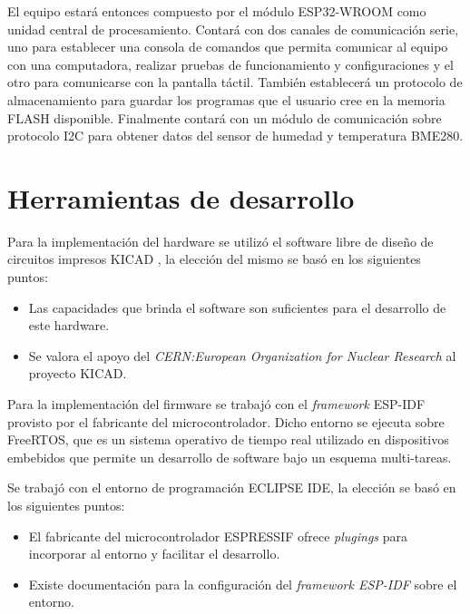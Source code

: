 El equipo estará entonces compuesto por el módulo ESP32-WROOM como unidad central de procesamiento. Contará con dos canales de comunicación serie, uno para establecer una consola de comandos que permita comunicar al equipo con una computadora, realizar pruebas de funcionamiento y configuraciones y el otro para comunicarse con la pantalla táctil. También establecerá un protocolo de almacenamiento para guardar los programas que el usuario cree en la memoria FLASH disponible. Finalmente contará con un módulo de comunicación sobre protocolo I2C para obtener datos del sensor de humedad y temperatura BME280.  


\section{Herramientas de desarrollo}

Para la implementación del hardware se utilizó el software libre de diseño de circuitos impresos KICAD \citep{web_kicad}, la elección del mismo se basó en los siguientes puntos:

\begin{itemize}
\item Las capacidades que brinda el software son suficientes para el desarrollo de este hardware.
\item Se valora el apoyo del \textit{CERN:European Organization for Nuclear Research} \citep{1_nota_web_kicad_cern} al proyecto KICAD.
\end{itemize}


Para la implementación del firmware se trabajó con el \textit{framework} ESP-IDF \citep{web_esp_idf} provisto por el fabricante del microcontrolador. Dicho entorno se ejecuta sobre FreeRTOS, que es un sistema operativo de tiempo real utilizado en dispositivos embebidos que permite un desarrollo de software bajo un esquema multi-tareas.

Se trabajó con el entorno de programación ECLIPSE IDE, la elección se basó en los siguientes puntos:
\begin{itemize}
\item El fabricante del microcontrolador ESPRESSIF ofrece \textit{plugings} para incorporar al entorno y facilitar el desarrollo. 
\item Existe documentación para la configuración del \textit{framework ESP-IDF} \citep{web_esp_idf_eclipse} sobre el entorno.
\end{itemize}
